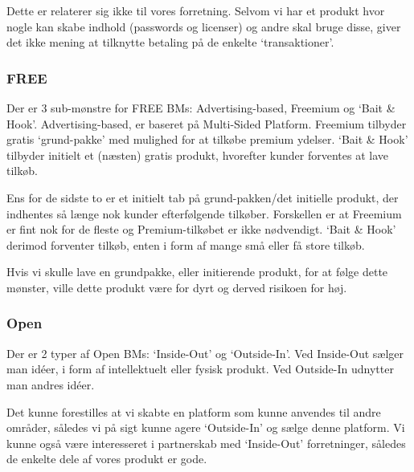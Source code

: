 Dette er relaterer sig ikke til vores forretning.
Selvom vi har et produkt hvor nogle kan skabe indhold (passwords og licenser) og andre skal bruge disse, giver det ikke mening at tilknytte betaling på de enkelte `transaktioner'.

\subsubsection{FREE}
Der er 3 sub-mønstre for FREE BMs: Advertising-based, Freemium og `Bait \& Hook'.
Advertising-based, er baseret på Multi-Sided Platform.
Freemium tilbyder gratis `grund-pakke' med mulighed for at tilkøbe premium ydelser.
`Bait \& Hook' tilbyder initielt et (næsten) gratis produkt, hvorefter kunder forventes at lave tilkøb.

Ens for de sidste to er et initielt tab på grund-pakken/det initielle produkt, der indhentes så længe nok kunder efterfølgende tilkøber.
Forskellen er at Freemium er fint nok for de fleste og Premium-tilkøbet er ikke nødvendigt.
`Bait \& Hook' derimod forventer tilkøb, enten i form af mange små eller få store tilkøb.

Hvis vi skulle lave en grundpakke, eller initierende produkt, for at følge dette mønster, ville dette produkt være for dyrt og derved risikoen for høj.

\subsubsection{Open}
Der er 2 typer af Open BMs: `Inside-Out' og `Outside-In'.
Ved Inside-Out sælger man idéer, i form af intellektuelt eller fysisk produkt.
Ved Outside-In udnytter man andres idéer.

Det kunne forestilles at vi skabte en platform som kunne anvendes til andre områder, således vi på sigt kunne agere `Outside-In' og sælge denne platform.
Vi kunne også være interesseret i partnerskab med `Inside-Out' forretninger, således de enkelte dele af vores produkt er gode.

